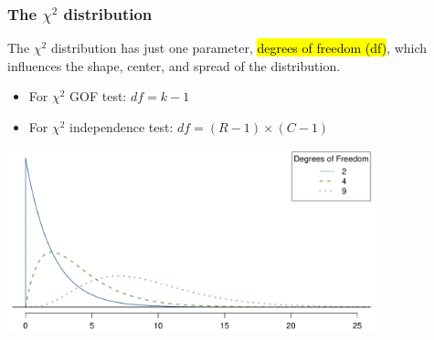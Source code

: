 \documentclass[slidestop,compress,mathserif,12pt,t,professionalfonts,xcolor=table]{beamer}
\begin{document}

\begin{frame}
\frametitle{The $\chi^2$ distribution}

The $\chi^2$ distribution has just one parameter, \hl{degrees of freedom (df)}, which influences the shape, center, and spread of the distribution.
\begin{itemize}
\item For $\chi^2$ GOF test: $df = k - 1$ \\
\item For $\chi^2$ independence test: $df = (R-1) \times (C-1)$ 
\end{itemize}

\pause

\begin{center}
\includegraphics[width=0.8\textwidth]{figures/chiSquareDistributionWithInceasingDF/chiSquareDistributionWithInceasingDF}
\end{center}

\end{frame}

\end{document}

